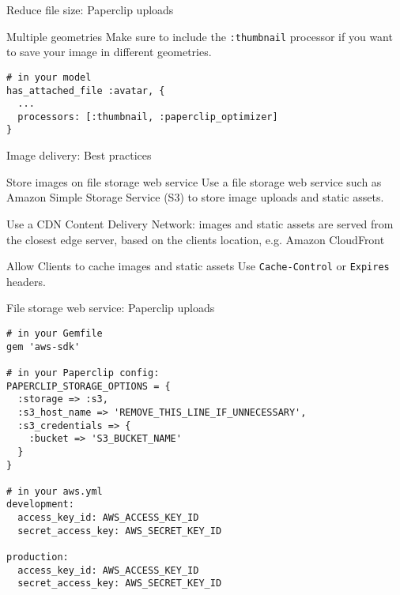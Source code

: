 \documentclass{beamer}
\begin{document}
\begin{frame}[fragile]{Reduce file size: Paperclip uploads}
\begin{block}{Multiple geometries}
Make sure to include the \lstinline{:thumbnail} processor if you want to save your image in different geometries.
\begin{lstlisting}
# in your model
has_attached_file :avatar, {
  ...
  processors: [:thumbnail, :paperclip_optimizer]
}
\end{lstlisting}
\end{block}
\end{frame}


\begin{frame}{Image delivery: Best practices}
\begin{block}{Store images on file storage web service}
Use a file storage web service such as Amazon Simple Storage Service (S3) to store image uploads and static assets.
\end{block}
\begin{block}{Use a CDN}
Content Delivery Network: images and static assets are served from the closest edge server, based on the clients location, e.g. Amazon CloudFront
\end{block}
\begin{block}{Allow Clients to cache images and static assets}
Use \lstinline{Cache-Control} or \lstinline{Expires} headers.
\end{block}
\end{frame}

\begin{frame}[fragile]{File storage web service: Paperclip uploads}
\begin{lstlisting}
# in your Gemfile
gem 'aws-sdk'

# in your Paperclip config:
PAPERCLIP_STORAGE_OPTIONS = {
  :storage => :s3,
  :s3_host_name => 'REMOVE_THIS_LINE_IF_UNNECESSARY',
  :s3_credentials => {
    :bucket => 'S3_BUCKET_NAME'
  }
}

# in your aws.yml
development:
  access_key_id: AWS_ACCESS_KEY_ID
  secret_access_key: AWS_SECRET_KEY_ID

production:
  access_key_id: AWS_ACCESS_KEY_ID
  secret_access_key: AWS_SECRET_KEY_ID
\end{lstlisting}
\end{frame}
\end{document}
